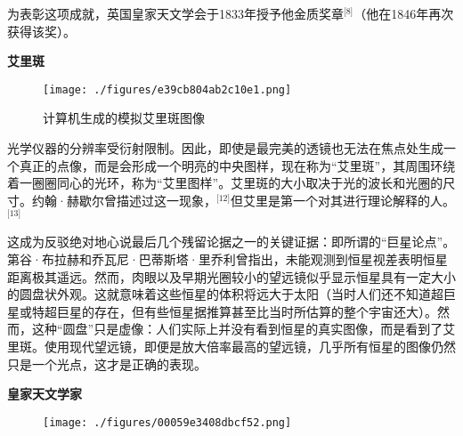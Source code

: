 为表彰这项成就，英国皇家天文学会于1833年授予他金质奖章\(^\text{[8]}\)（他在1846年再次获得该奖）。

\textbf{艾里斑}
\begin{figure}[ht]
\centering
\texttt{[image: ./figures/e39cb804ab2c10e1.png]}
\caption{计算机生成的模拟艾里斑图像} \label{fig_AL_3}
\end{figure}
光学仪器的分辨率受衍射限制。因此，即使是最完美的透镜也无法在焦点处生成一个真正的点像，而是会形成一个明亮的中央图样，现在称为“艾里斑”，其周围环绕着一圈圈同心的光环，称为“艾里图样”。艾里斑的大小取决于光的波长和光圈的尺寸。约翰·赫歇尔曾描述过这一现象，\(^\text{[12]}\)但艾里是第一个对其进行理论解释的人。\(^\text{[13]}\)

这成为反驳绝对地心说最后几个残留论据之一的关键证据：即所谓的“巨星论点”。第谷·布拉赫和乔瓦尼·巴蒂斯塔·里乔利曾指出，未能观测到恒星视差表明恒星距离极其遥远。然而，肉眼以及早期光圈较小的望远镜似乎显示恒星具有一定大小的圆盘状外观。这就意味着这些恒星的体积将远大于太阳（当时人们还不知道超巨星或特超巨星的存在，但有些恒星据推算甚至比当时所估算的整个宇宙还大）。然而，这种“圆盘”只是虚像：人们实际上并没有看到恒星的真实图像，而是看到了艾里斑。使用现代望远镜，即便是放大倍率最高的望远镜，几乎所有恒星的图像仍然只是一个光点，这才是正确的表现。

\textbf{皇家天文学家}
\begin{figure}[ht]
\centering
\texttt{[image: ./figures/00059e3408dbcf52.png]}
\caption{} \label{fig_AL_4}
\end{figure}